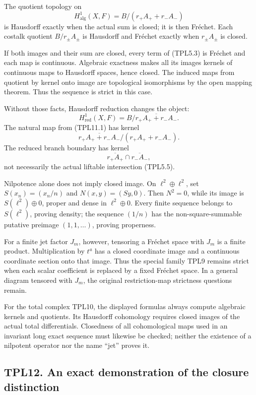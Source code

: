 The quotient topology on \[
H^1_{\mathrm{alg}}(X,F)=B/(r_+A_++r_-A_-)
\tag{TPL11.1}
\] is Hausdorff exactly when the actual sum is closed; it is then
Fréchet. Each costalk quotient \(B/r_\pm A_\pm\) is Hausdorff and
Fréchet exactly when \(r_\pm A_\pm\) is closed.

If both images and their sum are closed, every term of (TPL5.3) is
Fréchet and each map is continuous. Algebraic exactness makes all its
images kernels of continuous maps to Hausdorff spaces, hence closed. The
induced maps from quotient by kernel onto image are topological
isomorphisms by the open mapping theorem. Thus the sequence is strict in
this case.

Without those facts, Hausdorff reduction changes the object: \[
H^1_{\mathrm{red}}(X,F)=B/\overline{r_+A_++r_-A_-}.
\tag{TPL11.2}
\] The natural map from (TPL11.1) has kernel \[
\overline{r_+A_++r_-A_-}/(r_+A_++r_-A_-).
\tag{TPL11.3}
\] The reduced branch boundary has kernel \[
\overline{r_+A_+}\cap\overline{r_-A_-},
\tag{TPL11.4}
\] not necessarily the actual liftable intersection (TPL5.5).

Nilpotence alone does not imply closed image. On \(\ell^2\oplus\ell^2\),
set \(S(x_n)=(x_n/n)\) and \(N(x,y)=(Sy,0)\). Then \(N^2=0\), while its
image is \(S(\ell^2)\oplus0\), proper and dense in \(\ell^2\oplus0\).
Every finite sequence belongs to \(S(\ell^2)\), proving density; the
sequence \((1/n)\) has the non-square-summable putative preimage
\((1,1,\ldots)\), proving properness.

For a finite jet factor \(J_m\), however, tensoring a Fréchet space with
\(J_m\) is a finite product. Multiplication by \(t^a\) has a closed
coordinate image and a continuous coordinate section onto that image.
Thus the special family TPL9 remains strict when each scalar coefficient
is replaced by a fixed Fréchet space. In a general diagram tensored with
\(J_m\), the original restriction-map strictness questions remain.

For the total complex TPL10, the displayed formulas always compute
algebraic kernels and quotients. Its Hausdorff cohomology requires
closed images of the actual total differentials. Closedness of all
cohomological maps used in an invariant long exact sequence must
likewise be checked; neither the existence of a nilpotent operator nor
the name ``jet'' proves it.

\subsection{TPL12. An exact demonstration of the closure
distinction}\label{tpl12.-an-exact-demonstration-of-the-closure-distinction}

